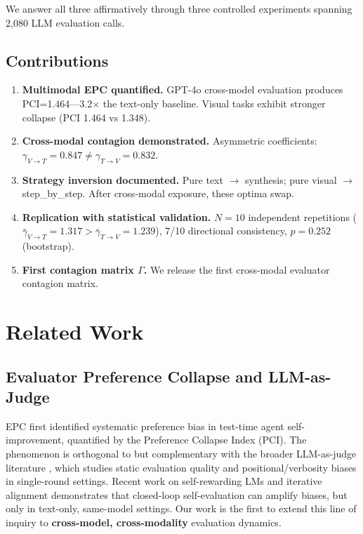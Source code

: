 \documentclass[11pt,a4paper]{article}
\begin{document}
We answer all three affirmatively through three controlled experiments spanning 2,080 LLM evaluation calls.

\subsection{Contributions}
\begin{enumerate}[leftmargin=*]
    \item \textbf{Multimodal EPC quantified.} GPT-4o cross-model evaluation produces PCI=1.464---3.2$\times$ the text-only baseline. Visual tasks exhibit stronger collapse (PCI 1.464 vs 1.348).
    \item \textbf{Cross-modal contagion demonstrated.} Asymmetric coefficients: $\gamma_{V\to T}=0.847 \neq \gamma_{T\to V}=0.832$.
    \item \textbf{Strategy inversion documented.} Pure text $\to$ synthesis; pure visual $\to$ step\_by\_step. After cross-modal exposure, these optima swap.
    \item \textbf{Replication with statistical validation.} $N=10$ independent repetitions ($\bar{\gamma}_{V\to T}=1.317 > \bar{\gamma}_{T\to V}=1.239$), 7/10 directional consistency, $p=0.252$ (bootstrap).
    \item \textbf{First contagion matrix $\Gamma$.} We release the first cross-modal evaluator contagion matrix.
\end{enumerate}

\section{Related Work}

\subsection{Evaluator Preference Collapse and LLM-as-Judge}

EPC \cite{liu2026epc} first identified systematic preference bias in test-time agent self-improvement, quantified by the Preference Collapse Index (PCI). The phenomenon is orthogonal to but complementary with the broader LLM-as-judge literature \cite{zheng2023judging, li2024alpacaeval, verga2024arbiter}, which studies static evaluation quality and positional/verbosity biases in single-round settings. Recent work on self-rewarding LMs \cite{yuan2024selfrewarding} and iterative alignment \cite{chen2024selfplay} demonstrates that closed-loop self-evaluation can amplify biases, but only in text-only, same-model settings. Our work is the first to extend this line of inquiry to \textbf{cross-model, cross-modality} evaluation dynamics.
\end{document}
